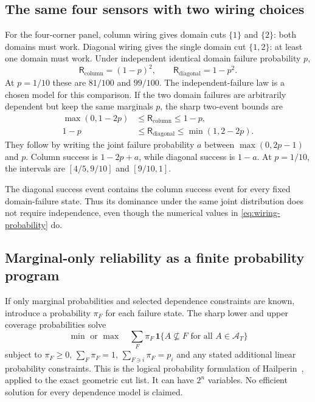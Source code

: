 \subsection{The same four sensors with two wiring choices}
For the four-corner panel, column wiring gives domain cuts $\{1\}$ and $\{2\}$: both domains must work. Diagonal wiring gives the single domain cut $\{1,2\}$: at least one domain must work. Under independent identical domain failure probability $p$,
\begin{equation}\label{eq:wiring-probability}
\mathsf R_{\mathrm{column}}=(1-p)^2,
\qquad
\mathsf R_{\mathrm{diagonal}}=1-p^2.
\end{equation}
At $p=1/10$ these are $81/100$ and $99/100$. The independent-failure law is a chosen model for this comparison. If the two domain failures are arbitrarily dependent but keep the same marginals $p$, the sharp two-event bounds are
\begin{align}
\max(0,1-2p)&\le\mathsf R_{\mathrm{column}}\le1-p,\label{eq:column-frechet}\\
1-p&\le\mathsf R_{\mathrm{diagonal}}\le\min(1,2-2p).\label{eq:diagonal-frechet}
\end{align}
They follow by writing the joint failure probability $a$ between $\max(0,2p-1)$ and $p$. Column success is $1-2p+a$, while diagonal success is $1-a$. At $p=1/10$, the intervals are $[4/5,9/10]$ and $[9/10,1]$.

The diagonal success event contains the column success event for every fixed domain-failure state. Thus its dominance under the same joint distribution does not require independence, even though the numerical values in \cref{eq:wiring-probability} do.

\subsection{Marginal-only reliability as a finite probability program}
If only marginal probabilities and selected dependence constraints are known, introduce a probability $\pi_F$ for each failure state. The sharp lower and upper coverage probabilities solve
\[
\min\text{ or }\max\quad\sum_F \pi_F\,\mathbf1\{A\not\subseteq F\text{ for all }A\in\mathcal A_T\}
\]
subject to $\pi_F\ge0$, $\sum_F\pi_F=1$, $\sum_{F\ni i}\pi_F=p_i$ and any stated additional linear probability constraints. This is the logical probability formulation of Hailperin~\cite{hailperin}, applied to the exact geometric cut list. It can have $2^n$ variables. No efficient solution for every dependence model is claimed.

